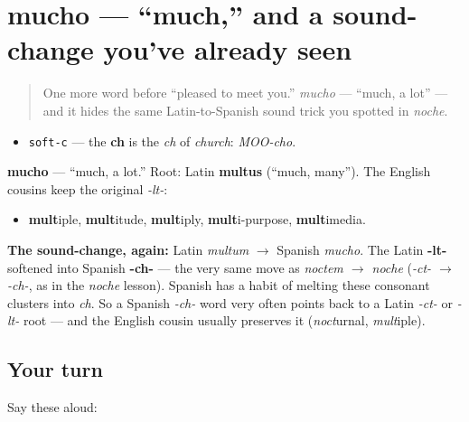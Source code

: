 \section[mucho]{mucho — \textquotedblleft{}much,\textquotedblright{} and a sound-change you've already seen}

\label{lesson:ES-C03-mucho}



\begin{quote}
One more word before \textquotedblleft{}pleased to meet you.\textquotedblright{} \emph{mucho} — \textquotedblleft{}much, a lot\textquotedblright{} — and it hides the same Latin-to-Spanish sound trick you spotted in \emph{noche}.
\end{quote}

\begin{sounds}
\begin{itemize}
\raggedright
  \item \texttt{soft-c} — the \textbf{ch} is the \emph{ch} of \emph{church}: \emph{MOO-cho}.
\end{itemize}
\end{sounds}

\begin{cousinweb}
\textbf{mucho} — \textquotedblleft{}much, a lot.\textquotedblright{} Root: Latin \textbf{multus} (\textquotedblleft{}much, many\textquotedblright{}). The English cousins keep the original \emph{-lt-}:

\begin{itemize}
\raggedright
  \item \textbf{mult}iple, \textbf{mult}itude, \textbf{mult}iply, \textbf{mult}i-purpose, \textbf{mult}imedia.
\end{itemize}

\textbf{The sound-change, again:} Latin \emph{multum} $\to$ Spanish \emph{mucho}. The Latin \textbf{-lt-} softened into Spanish \textbf{-ch-} — the very same move as \emph{noctem $\to$ noche} (\emph{-ct- $\to$ -ch-}, as in the \emph{noche} lesson). Spanish has a habit of melting these consonant clusters into \emph{ch}. So a Spanish \emph{-ch-} word very often points back to a Latin \emph{-ct-} or \emph{-lt-} root — and the English cousin usually preserves it (\emph{noct}urnal, \emph{mult}iple).
\end{cousinweb}

\subsection*{Your turn}
Say these aloud:

